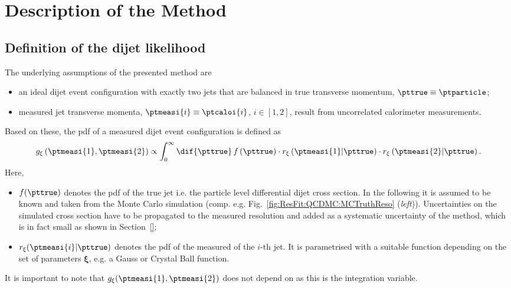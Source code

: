

\section{Description of the Method}\label{sec:ResFit:Method}

\subsection{Definition of the dijet likelihood}\label{sec:ResFit:Method:Likelihood}

The underlying assumptions of the presented method are
\begin{itemize}
\item an ideal dijet event configuration with exactly two jets that
  are balanced in true transverse momentum, \mbox{$\pttrue\equiv\ptparticle$};
\item measured jet transverse momenta,
  \mbox{$\ptmeasi{i}\equiv\ptcaloi{i}$}, $i\in[1,2]$, result from uncorrelated
  calorimeter measurements.
\end{itemize}
Based on these, the pdf of a measured dijet event configuration is defined as
\begin{equation}
  \label{eq:ResFit:DijetPdf}
  g_{\mathbf{\xi}}\left(\ptmeasi{1},\ptmeasi{2}\right) \propto \int^{\infty}_{0}\dif{\pttrue}\,f\left(\pttrue\right)
  \cdot r_{\mathbf{\xi}}\left(\ptmeasi{1}|\pttrue\right)
  \cdot r_{\mathbf{\xi}}\left(\ptmeasi{2}|\pttrue\right).
\end{equation}
Here,
\begin{itemize}
\item $f(\pttrue)$ denotes the pdf of the true jet \pt
  i.e. the particle level differential dijet cross section.
  In the following it is assumed to be known
  and taken from the Monte Carlo simulation
  (comp. e.g. Fig.~\ref{fig:ResFit:QCDMC:MCTruthReso} (\textit{left})).
  Uncertainties on the simulated cross section have to be propagated to
  the measured resolution and added as a systematic uncertainty of the
  method, which is in fact small as shown in Section~\ref{};
\item $r_{\mathbf{\xi}}(\ptmeasi{i}|\pttrue)$ denotes the pdf of the measured \pt
  of the $i$-th jet.
  It is parametrised with a suitable function depending on the set of
  parameters $\mathbf{\xi}$, e.g. a Gauss or Crystal Ball function.
\end{itemize}
It is important to note that
$g_{\mathbf{\xi}}(\ptmeasi{1},\ptmeasi{2})$ does not depend on \pttrue
as this is the integration variable.

